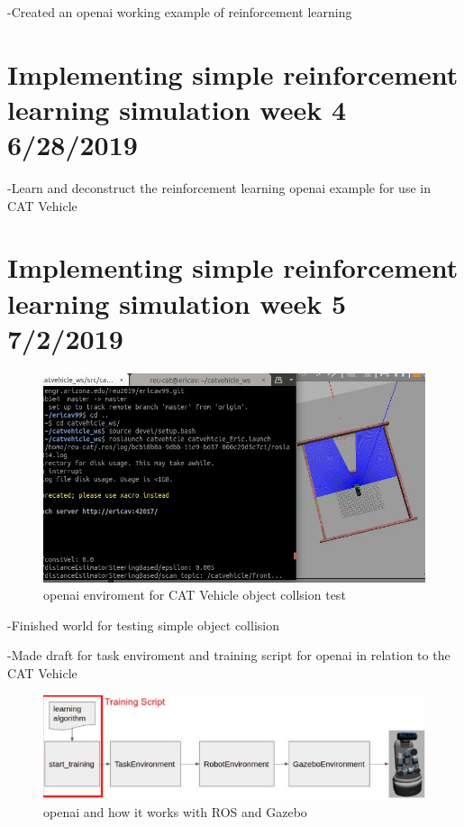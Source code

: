 \documentclass[12pt]{article}
\begin{document}
-Created an openai working example of reinforcement learning

\section{Implementing simple reinforcement learning simulation week 4 6/28/2019}

-Learn and deconstruct the reinforcement learning openai example for use in CAT Vehicle

\section{Implementing simple reinforcement learning simulation week 5 7/2/2019}

\begin{figure}[h]
\begin{center}
	\includegraphics[scale=.5]{completesquare.JPG}
	\caption{openai enviroment for CAT Vehicle object collsion test}
\end{center}
\end{figure}

-Finished world for testing simple object collision

-Made draft for task enviroment and training script for openai in relation to the CAT Vehicle

\begin{figure}[h]
\begin{center}
	\includegraphics[scale=.5]{johnpic.JPG}
	\caption{openai and how it works with ROS and Gazebo}
\end{center}
\end{figure}
\end{document}
